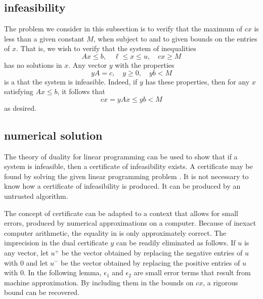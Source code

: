 \subsection{infeasibility}

The problem we consider in this subsection is to verify that the
maximum of $c x$ is less than a given constant $M$, when subject to
 and to given bounds on the entries of $x$.
That is, we wish to verify that the system of inequalities
\begin{equation}\label{eqn:empty}
A x \le b,\quad \ell \le x\le u,\quad c x \ge M
\end{equation}
has no solutions in $x$. Any vector $y$ with the properties
\begin{equation}\label{eqn:y}
  y A = c,\quad y\ge 0,\quad y b < M
\end{equation}
is a  that the system  is infeasible.  Indeed,
if $y$ has these properties, then for any $x$ satisfying
$A x \le b$, it follows that
\begin{equation}\label{eqn:cxM}
  c x = y A x \le y b < M
\end{equation}
as desired.


\subsection{numerical solution}


The theory of duality for linear programming can be used to show that if a
system is infeasible, then a certificate of infeasibility exists.  A certificate
may be found by solving the given linear programming problem .
It is not necessary to know how a
certificate of infeasibility is produced.  It can be produced 
by an untrusted algorithm.  

The concept of certificate can be
adapted to a context that allows for small  errors, produced by
numerical approximations on a computer.
Because of inexact computer arithmetic, the
equality in  is only  approximately correct. The imprecision in the
dual certificate $y$ can be readily eliminated as follows. If $u$ is any
vector, let $u^+$ be the vector obtained by replacing the negative
entries of $u$ with $0$ and let $u^-$ be the vector obtained by
replacing the positive entries of $u$ with $0$.  In the
following lemma, $\epsilon_1$ and $\epsilon_2$ are small error terms
that result from machine approximation. By including them in the
bounds on $c x$, a rigorous bound can be recovered.  


